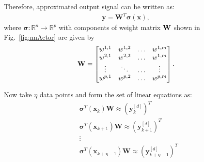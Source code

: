\documentclass{beamer}
\begin{document}
\begin{frame}

  Therefore, approximated output signal can be written as:
\begin{align}
  \label{eq:approximatePolicyActorWeights}
    \mathbf{y} = \mathbf{W}^T\bm{\sigma}(\mathbf{x}),
  \end{align}
%
where $\bm{\sigma}:\mathbb{R}^n\to\mathbb{R}^{p}$ with components of weight matrix ${\bf W}$ shown in Fig.~\ref{fig:nnActor} are given by %
%
\begin{align*}
  {\bf W} = 
  \begin{bmatrix}
    w^{1,1} &  w^{1,2} & \ldots &w^{1,m}\\
    w^{2,1} & w^{2,2}& \ldots &w^{1,m}\\
    \vdots & \ddots & \ldots &\vdots\\
    w^{p,1} & w^{p,2}& \ldots &w^{p,m}
  \end{bmatrix}.
\end{align*}
%

Now take $\eta$ data points and form the set of linear equations as: %
%
\begin{align*}
&  \bm{\sigma}^T(\mathbf{x}_k) \mathbf{W}  \approx     \left(\mathbf{y}_{k}^{[d]}\right)^T\\
 & \bm{\sigma}^T(\mathbf{x}_{k+1}) \mathbf{W}  \approx     \left(\mathbf{y}_{k+1}^{[d]}\right)^T\\
                                            &\vdots \\
 & \bm{\sigma}^T(\mathbf{x}_{k+\eta-1}) \mathbf{W}  \approx     \left(\mathbf{y}_{k+\eta-1}^{[d]}\right)^T  
\end{align*}
%
\end{frame}
\end{document}
